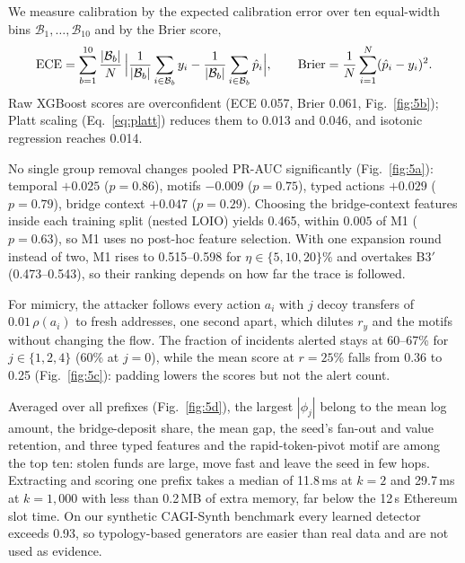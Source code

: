 \documentclass[runningheads]{llncs}
\newcommand{\1}{\mathbb{1}}
\begin{document}
We measure calibration by the expected calibration error over ten equal-width bins $\mathcal{B}_1,\dots,\mathcal{B}_{10}$ and by the Brier score,
\begin{equation}
\mathrm{ECE}=\sum_{b=1}^{10}\frac{|\mathcal{B}_b|}{N}\,\Bigl|\frac{1}{|\mathcal{B}_b|}\sum_{i\in\mathcal{B}_b}y_i-\frac{1}{|\mathcal{B}_b|}\sum_{i\in\mathcal{B}_b}\hat p_i\Bigr|,\qquad
\mathrm{Brier}=\frac1N\sum_{i=1}^{N}(\hat p_i-y_i)^2 .
\label{eq:ece}
\end{equation}
Raw XGBoost scores are overconfident (ECE 0.057, Brier 0.061, Fig.~\ref{fig:5b}); Platt scaling (Eq.~\eqref{eq:platt}) reduces them to 0.013 and 0.046, and isotonic regression reaches 0.014.

No single group removal changes pooled PR-AUC significantly (Fig.~\ref{fig:5a}): temporal $+0.025$ ($p=0.86$), motifs $-0.009$ ($p=0.75$), typed actions $+0.029$ ($p=0.79$), bridge context $+0.047$ ($p=0.29$).
Choosing the bridge-context features inside each training split (nested LOIO) yields 0.465, within $0.005$ of M1 ($p=0.63$), so M1 uses no post-hoc feature selection.
With one expansion round instead of two, M1 rises to 0.515--0.598 for $\eta\in\{5,10,20\}\%$ and overtakes B3$'$ (0.473--0.543), so their ranking depends on how far the trace is followed.

For mimicry, the attacker follows every action $a_i$ with $j$ decoy transfers of $0.01\,\rho(a_i)$ to fresh addresses, one second apart, which dilutes $r_y$ and the motifs without changing the flow.
The fraction of incidents alerted stays at 60--67\% for $j\in\{1,2,4\}$ (60\% at $j=0$), while the mean score at $r=25\%$ falls from 0.36 to 0.25 (Fig.~\ref{fig:5c}): padding lowers the scores but not the alert count.

Averaged over all prefixes (Fig.~\ref{fig:5d}), the largest $|\phi_j|$ belong to the mean log amount, the bridge-deposit share, the mean gap, the seed's fan-out and value retention, and three typed features and the rapid-token-pivot motif are among the top ten: stolen funds are large, move fast and leave the seed in few hops.
Extracting and scoring one prefix takes a median of 11.8\,ms at $k=2$ and 29.7\,ms at $k=1{,}000$ with less than 0.2\,MB of extra memory, far below the 12\,s Ethereum slot time.
On our synthetic CAGI-Synth benchmark every learned detector exceeds 0.93, so typology-based generators are easier than real data and are not used as evidence.
\end{document}
